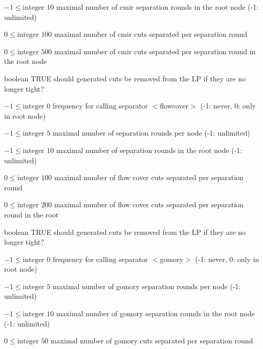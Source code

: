 %
{$-1\leq\textrm{integer}$}%
{$10$}%
{maximal number of cmir separation rounds in the root node (-1: unlimited)}%
{}

%
{$0\leq\textrm{integer}$}%
{$100$}%
{maximal number of cmir cuts separated per separation round}%
{}

%
{$0\leq\textrm{integer}$}%
{$500$}%
{maximal number of cmir cuts separated per separation round in the root node}%
{}

%
{boolean}%
{TRUE}%
{should generated cuts be removed from the LP if they are no longer tight?}%
{}

%
{$-1\leq\textrm{integer}$}%
{$0$}%
{frequency for calling separator $<$flowcover$>$ (-1: never, 0: only in root node)}%
{}

%
{$-1\leq\textrm{integer}$}%
{$5$}%
{maximal number of separation rounds per node (-1: unlimited)}%
{}

%
{$-1\leq\textrm{integer}$}%
{$10$}%
{maximal number of separation rounds in the root node (-1: unlimited)}%
{}

%
{$0\leq\textrm{integer}$}%
{$100$}%
{maximal number of flow cover cuts separated per separation round}%
{}

%
{$0\leq\textrm{integer}$}%
{$200$}%
{maximal number of flow cover cuts separated per separation round in the root}%
{}

%
{boolean}%
{TRUE}%
{should generated cuts be removed from the LP if they are no longer tight?}%
{}

%
{$-1\leq\textrm{integer}$}%
{$0$}%
{frequency for calling separator $<$gomory$>$ (-1: never, 0: only in root node)}%
{}

%
{$-1\leq\textrm{integer}$}%
{$5$}%
{maximal number of gomory separation rounds per node (-1: unlimited)}%
{}

%
{$-1\leq\textrm{integer}$}%
{$10$}%
{maximal number of gomory separation rounds in the root node (-1: unlimited)}%
{}

%
{$0\leq\textrm{integer}$}%
{$50$}%
{maximal number of gomory cuts separated per separation round}%
{}

